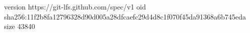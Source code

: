 version https://git-lfs.github.com/spec/v1
oid sha256:11f2b8fa12796328d90d005a28dfcaefc29d4d8c1f070f45da91368a6b745eda
size 43840
